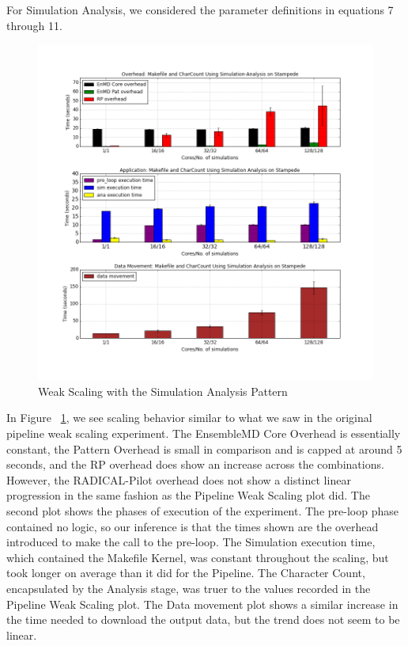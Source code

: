 \documentclass[]{article}
\begin{document}
		For Simulation Analysis, we considered the parameter definitions in equations 7 through 11.

		\begin{samepage}
			\begin{figure}[H]
				\centering
				\includegraphics[scale=.29]{iteration_3/sa_weak_scaling.png}
				\caption{Weak Scaling with the Simulation Analysis Pattern}
				\label{fig:sa_weak_scaling}
			\end{figure}

			In Figure ~\ref{fig:sa_weak_scaling}, we see scaling behavior similar to what we saw in the original pipeline weak scaling experiment. The EnsembleMD Core Overhead is essentially constant, the Pattern Overhead is small in comparison and is capped at around 5 seconds, and the RP overhead does show an increase across the combinations. However, the RADICAL-Pilot overhead does not show a distinct linear progression in the same fashion as the Pipeline Weak Scaling plot did. 
			The second plot shows the phases of execution of the experiment. The pre-loop phase contained no logic, so our inference is that the times shown are the overhead introduced to make the call to the pre-loop. The Simulation execution time, which contained the Makefile Kernel, was constant throughout the scaling, but took longer on average than it did for the Pipeline. The Character Count, encapsulated by the Analysis stage, was truer to the values recorded in the Pipeline Weak Scaling plot.
			The Data movement plot shows a similar increase in the time needed to download the output data, but the trend does not seem to be linear. 
		\end{samepage}
\end{document}
